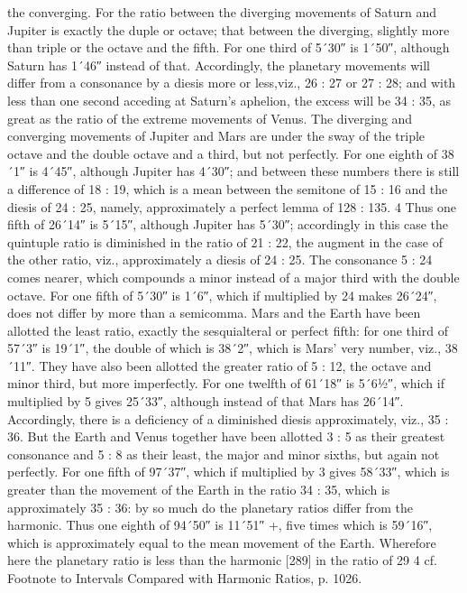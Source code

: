 \documentclass{article}
\begin{document}
the converging. For the ratio between the diverging movements of
Saturn and Jupiter is exactly the duple or octave; that between the
diverging, slightly more than triple or the octave and the fifth. For one
third of 5´30″ is 1´50″, although Saturn has 1´46″ instead of that.
Accordingly, the planetary movements will differ from a consonance by a
diesis more or less,viz., 26 : 27 or 27 : 28; and with less than one second
acceding at Saturn's aphelion, the excess will be 34 : 35, as great as the
ratio of the extreme movements of Venus. The diverging and converging
movements of Jupiter and Mars are under the sway of the triple octave
and the double octave and a third, but not perfectly. For one eighth of
38´1″ is 4´45″, although Jupiter has 4´30″; and between these numbers
there is still a difference of 18 : 19, which is a mean between the semitone
of 15 : 16 and the diesis of 24 : 25, namely, approximately a perfect
lemma of 128 : 135. 4 Thus one fifth of 26´14″ is 5´15″, although Jupiter
has 5´30″; accordingly in this case the quintuple ratio is diminished in
the ratio of 21 : 22, the augment in the case of the other ratio, viz.,
approximately a diesis of 24 : 25.
The consonance 5 : 24 comes nearer, which compounds a minor instead
of a major third with the double octave. For one fifth of 5´30″ is 1´6″,
which if multiplied by 24 makes 26´24″, does not differ by more than a
semicomma. Mars and the Earth have been allotted the least ratio,
exactly the sesquialteral or perfect fifth: for one third of 57´3″ is 19´1″,
the double of which is 38´2″, which is Mars’ very number, viz., 38´11″.
They have also been allotted the greater ratio of 5 : 12, the octave and
minor third, but more imperfectly. For one twelfth of 61´18″ is 5´6½″,
which if multiplied by 5 gives 25´33″, although instead of that Mars has
26´14″. Accordingly, there is a deficiency of a diminished diesis
approximately, viz., 35 : 36. But the Earth and Venus together have been
allotted 3 : 5 as their greatest consonance and 5 : 8 as their least, the
major and minor sixths, but again not perfectly. For one fifth of 97´37″,
which if multiplied by 3 gives 58´33″, which is greater than the
movement of the Earth in the ratio 34 : 35, which is approximately 35 :
36: by so much do the planetary ratios differ from the harmonic. Thus
one eighth of 94´50″ is 11´51″ +, five times which is 59´16″, which is
approximately equal to the mean movement of the Earth. Wherefore
here the planetary ratio is less than the harmonic [289] in the ratio of 29
4 cf. Footnote to Intervals Compared with Harmonic Ratios, p. 1026.
\end{document}
